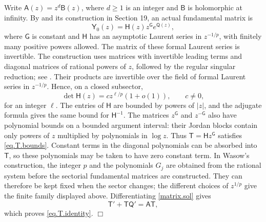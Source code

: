 \documentclass[a4paper,12pt]{article}
\newenvironment{proof}
{\noindent{\it Proof.}}{\hfill $\Box$\par\vspace{2.5mm}}
\numberwithin{equation}{section}
\begin{document}
\begin{proof}
Write $\mathsf{A}(z)=z^d\mathsf{B}(z)$, where $d\ge1$ is an integer and
$\mathsf{B}$ is holomorphic at infinity. By \cite[Theorem 19.1, pp.~111--112]{Wasow}
and its construction in Section 19, an actual fundamental matrix is
\[
 \mathsf{Y}_0(z)=\mathsf{H}(z)z^{\mathsf{G}}e^{\mathsf{Q}(z)},
\]
where $\mathsf{G}$ is constant and $\mathsf{H}$ has an asymptotic Laurent series
in $z^{-1/p}$, with finitely many positive powers allowed.
The matrix of these formal Laurent series is invertible. The construction uses
matrices with invertible leading terms and diagonal matrices of
rational powers of $z$, followed by the regular singular reduction;
see \cite[pp.~58--60, 95--98, 101--111]{Wasow}.
Their products are invertible over the field of formal Laurent series
in $z^{-1/p}$. Hence, on a closed subsector,
\[
 \det\mathsf{H}(z)=c z^{\ell/p}(1+o(1)),\qquad c\ne0,
\]
for an integer $\ell$. The entries of $\mathsf{H}$ are bounded by powers
of $|z|$, and the adjugate formula gives the same bound for $\mathsf{H}^{-1}$.
The matrices $z^{\mathsf{G}}$ and $z^{-\mathsf{G}}$ also have polynomial bounds
on a bounded argument interval: their Jordan blocks contain only
powers of $z$ multiplied by polynomials in $\log z$.
Thus $\mathsf{T}=\mathsf{H} z^{\mathsf{G}}$ satisfies \eqref{eq.T.bounds}.
Constant terms in the diagonal polynomials can be absorbed into $\mathsf{T}$,
so these polynomials may be taken to have zero constant term.
In Wasow's construction, the integer $p$ and the polynomials $G_j$
are obtained from the rational system before the sectorial fundamental
matrices are constructed. They can therefore be kept fixed when the
sector changes; the different choices of $z^{1/p}$ give the finite
family displayed above.
Differentiating \eqref{matrix.sol} gives
\[
 \mathsf{T}'+\mathsf{T}\mathsf{Q}'=\mathsf{A}\mathsf{T},
\]
which proves \eqref{eq.T.identity}.
\end{proof}
\end{document}
